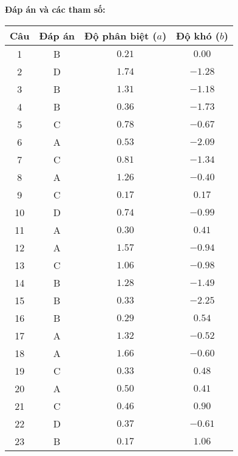 \noindent\textbf{Đáp án và các tham số:}
\begin{longtable}{|c|c|c|c|}\hline
	\textbf{Câu} & \textbf{Đáp án} & \textbf{Độ phân biệt ($a$)} & \textbf{Độ khó ($b$)} \\\hline
	\endhead
	1 & B & $0.21$ & $0.00$ \\\hline
	2 & D & $1.74$ & $-1.28$ \\\hline
	3 & B & $1.31$ & $-1.18$ \\\hline
	4 & B & $0.36$ & $-1.73$ \\\hline
	5 & C & $0.78$ & $-0.67$ \\\hline
	6 & A & $0.53$ & $-2.09$ \\\hline
	7 & C & $0.81$ & $-1.34$ \\\hline
	8 & A & $1.26$ & $-0.40$ \\\hline
	9 & C & $0.17$ & $0.17$ \\\hline
	10 & D & $0.74$ & $-0.99$ \\\hline
	11 & A & $0.30$ & $0.41$ \\\hline
	12 & A & $1.57$ & $-0.94$ \\\hline
	13 & C & $1.06$ & $-0.98$ \\\hline
	14 & B & $1.28$ & $-1.49$ \\\hline
	15 & B & $0.33$ & $-2.25$ \\\hline
	16 & B & $0.29$ & $0.54$ \\\hline
	17 & A & $1.32$ & $-0.52$ \\\hline
	18 & A & $1.66$ & $-0.60$ \\\hline
	19 & C & $0.33$ & $0.48$ \\\hline
	20 & A & $0.50$ & $0.41$ \\\hline
	21 & C & $0.46$ & $0.90$ \\\hline
	22 & D & $0.37$ & $-0.61$ \\\hline
	23 & B & $0.17$ & $1.06$ \\\hline
\end{longtable}

